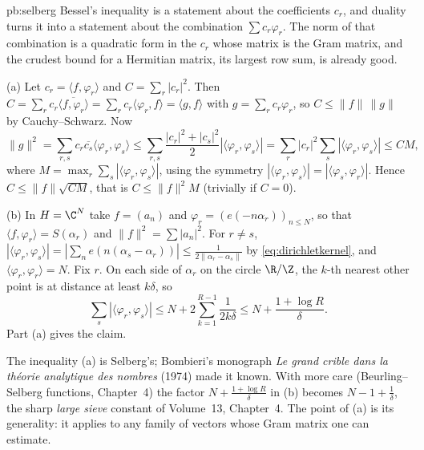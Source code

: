 \begin{solution}{pb:selberg}
\idea Bessel's inequality is a statement about the coefficients $c_r$, and duality turns it into a statement about the combination $\sum c_r\varphi_r$. The norm of
that combination is a quadratic form in the $c_r$ whose matrix is the Gram matrix, and the crudest bound for a Hermitian matrix, its largest row sum, is already good.

\writeup (a) Let $c_r=\langle f,\varphi_r\rangle$ and $C=\sum_r|c_r|^2$. Then
$C=\sum_rc_r\overline{\langle f,\varphi_r\rangle}=\sum_rc_r\langle\varphi_r,f\rangle=\langle g,f\rangle$ with $g=\sum_rc_r\varphi_r$, so $C\le\|f\|\,\|g\|$ by Cauchy--Schwarz. Now
\[
\|g\|^2=\sum_{r,s}c_r\overline{c_s}\langle\varphi_r,\varphi_s\rangle\le\sum_{r,s}\frac{|c_r|^2+|c_s|^2}2|\langle\varphi_r,\varphi_s\rangle|=\sum_r|c_r|^2\sum_s|\langle\varphi_r,\varphi_s\rangle|\le CM,
\]
where $M=\max_r\sum_s|\langle\varphi_r,\varphi_s\rangle|$, using the symmetry $|\langle\varphi_r,\varphi_s\rangle|=|\langle\varphi_s,\varphi_r\rangle|$. Hence $C\le\|f\|\sqrt{CM}$, that is
$C\le\|f\|^2M$ (trivially if $C=0$).

(b) In $H=\C^N$ take $f=(a_n)$ and $\varphi_r=(e(-n\alpha_r))_{n\le N}$, so that $\langle f,\varphi_r\rangle=S(\alpha_r)$ and $\|f\|^2=\sum|a_n|^2$. For $r\ne s$,
$|\langle\varphi_r,\varphi_s\rangle|=|\sum_ne(n(\alpha_s-\alpha_r))|\le\frac1{2\|\alpha_r-\alpha_s\|}$ by \eqref{eq:dirichletkernel}, and $\langle\varphi_r,\varphi_r\rangle=N$. Fix $r$. On each side of
$\alpha_r$ on the circle $\R/\Z$, the $k$-th nearest other point is at distance at least $k\delta$, so
\[
\sum_s|\langle\varphi_r,\varphi_s\rangle|\le N+2\sum_{k=1}^{R-1}\frac1{2k\delta}\le N+\frac{1+\log R}\delta.
\]
Part (a) gives the claim.

\leads The inequality (a) is Selberg's; Bombieri's monograph \emph{Le grand crible dans la théorie analytique des nombres} (1974) made it known. With more care (Beurling--Selberg functions, Chapter~4) the factor
$N+\frac{1+\log R}\delta$ in (b) becomes $N-1+\frac1\delta$, the sharp \emph{large sieve} constant of Volume~13, Chapter~4. The point of (a) is its generality: it
applies to any family of vectors whose Gram matrix one can estimate.
\end{solution}

